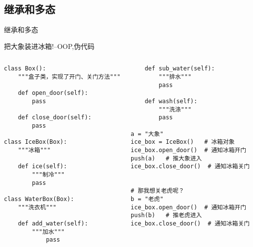 \subsection{继承和多态}
\begin{frame}[standout] 继承和多态 \end{frame}
\begin{frame}[fragile]{把大象装进冰箱!--OOP,伪代码}
    \begin{columns}
        \begin{lstlisting}
class Box():
    """盒子类，实现了开门、关门方法"""

    def open_door(self):
        pass

    def close_door(self):
        pass

class IceBox(Box):
    """冰箱"""

    def ice(self):
        """制冷"""
        pass

class WaterBox(Box):
    """洗衣机"""
    
    def add_water(self):
        """加水"""
            pass
        \end{lstlisting}
        \begin{lstlisting}
    def sub_water(self):
        """排水"""
        pass   

    def wash(self):
        """洗涤"""
        pass

a = "大象"
ice_box = IceBox()   # 冰箱对象
ice_box.open_door()  # 通知冰箱开门
push(a)   # 推大象进入
ice_box.close_door()  # 通知冰箱关门


# 那我想关老虎呢？
b = "老虎"
ice_box.open_door()  # 通知冰箱开门
push(b)   # 推老虎进入
ice_box.close_door()  # 通知冰箱关门
            \end{lstlisting}
    \end{columns}
\end{frame}


